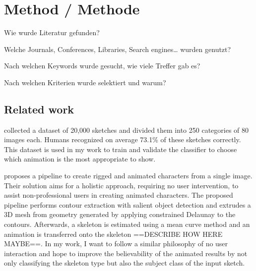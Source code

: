 \chapter{Method / Methode}
\label{ch:method}

Wie wurde Literatur gefunden?

Welche Journals, Conferences, Libraries, Search engines… wurden genutzt?

Nach welchen Keywords wurde gesucht, wie viele Treffer gab es?

Nach welchen Kriterien wurde selektiert und warum?

\section*{Related work}
\textcite{eitz2012hdhso} collected a dataset of 20,000 sketches and divided them
into 250 categories of 80 images each. Humans recognized on average 73.1\% of 
these sketches correctly. This dataset is used in my work to train and validate
the classifier to choose which animation is the most appropriate to show.

\textcite{10.1145/3469877.3490565} proposes a pipeline to create rigged and
animated characters from a single image. Their solution aims for a holistic
approach, requiring no user intervention, to assist non-professional users in
creating animated characters. The proposed pipeline performs contour extraction
with salient object detection and extrudes a 3D mesh from geometry generated by
applying constrained Delaunay to the contours. Afterwards, a skeleton is
estimated using a mean curve method and an animation is transferred onto the
skeleton ==DESCRIBE HOW HERE MAYBE==. In my work, I want to follow a similar
philosophy of no user interaction and hope to improve the believability of the
animated results by not only classifying the skeleton type but also the subject
class of the input sketch.
